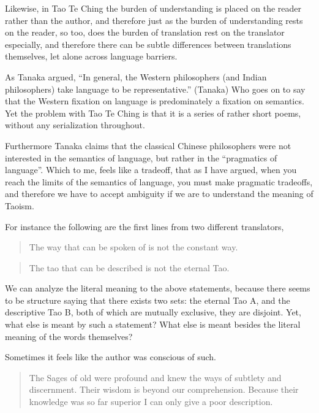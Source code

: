 Likewise, in Tao Te Ching the burden of understanding is placed on the reader rather than the author, and therefore just as the burden of understanding rests on the reader, so too, does the burden of translation rest on the translator especially, and therefore there can be subtle differences between translations themselves, let alone across language barriers. 

As Tanaka argued, “In general, the Western philosophers (and Indian philosophers) take language to be representative.” (Tanaka) Who goes on to say that the Western fixation on language is predominately a fixation on semantics. Yet the problem with Tao Te Ching is that it is a series of rather short poems, without any serialization throughout.

Furthermore Tanaka claims that the classical Chinese philosophers were not interested in the semantics of language, but rather in the “pragmatics of language”. Which to me, feels like a tradeoff, that as I have argued, when you reach the limits of the semantics of language, you must make pragmatic tradeoffs, and therefore we have to accept ambiguity if we are to understand the meaning of Taoism. 

For instance the following are the first lines from two different translators,

\begin{quotation}
    The way that can be spoken of is not the constant way.
\end{quotation} 

\begin{quotation}
    The tao that can be described is not the eternal Tao.
\end{quotation}

We can analyze the literal meaning to the above statements, because there seems to be structure saying that there exists two sets: the eternal Tao A, and the descriptive Tao B, both of which are mutually exclusive, they are disjoint.  Yet, what else is meant by such a statement? What else is meant besides the literal meaning of the words themselves? 

Sometimes it feels like the author was conscious of such. 

\begin{quotation}
    The Sages of old were profound and knew the ways of subtlety and discernment.
    Their wisdom is beyond our comprehension.
    Because their knowledge was so far superior I can only give a poor description. 
\end{quotation}

